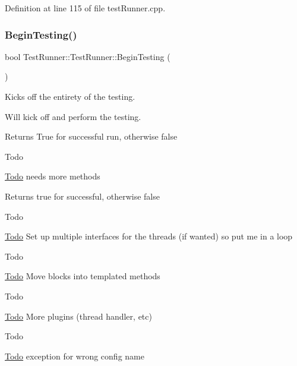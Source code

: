 Definition at line 115 of file test\+Runner.\+cpp.

\mbox{\label{classTestRunner_1_1TestRunner_a6d445a66f517e64d67f636d3bcab44c0}} 
\subsubsection{\texorpdfstring{BeginTesting()}{BeginTesting()}}
{\footnotesize\ttfamily bool Test\+Runner\+::\+Test\+Runner\+::\+Begin\+Testing (\begin{DoxyParamCaption}{ }\end{DoxyParamCaption})}



Kicks off the entirety of the testing. 

Will kick off and perform the testing.

\begin{DoxyReturn}{Returns}
True for successful run, otherwise false
\end{DoxyReturn}
\begin{DoxyRefDesc}{Todo}
\item[\mbox{\hyperlink{todo__todo000034}{Todo}}]needs more methods \end{DoxyRefDesc}
\begin{DoxyReturn}{Returns}
true for successful, otherwise false 
\end{DoxyReturn}
\begin{DoxyRefDesc}{Todo}
\item[\mbox{\hyperlink{todo__todo000035}{Todo}}]Set up multiple interfaces for the threads (if wanted) so put me in a loop \end{DoxyRefDesc}
\begin{DoxyRefDesc}{Todo}
\item[\mbox{\hyperlink{todo__todo000036}{Todo}}]Move blocks into templated methods \end{DoxyRefDesc}
\begin{DoxyRefDesc}{Todo}
\item[\mbox{\hyperlink{todo__todo000037}{Todo}}]More plugins (thread handler, etc) \end{DoxyRefDesc}
\begin{DoxyRefDesc}{Todo}
\item[\mbox{\hyperlink{todo__todo000038}{Todo}}]exception for wrong config name \end{DoxyRefDesc}


